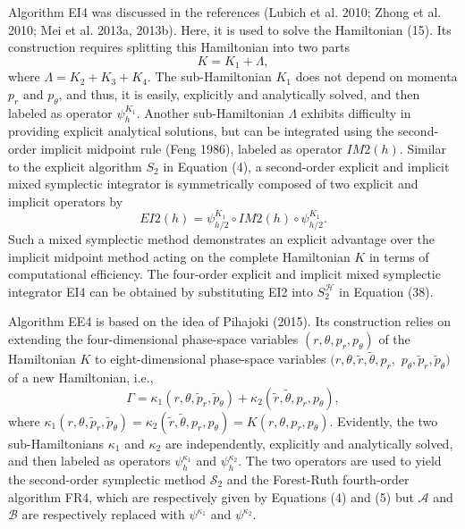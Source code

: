 \documentclass[preprint2]{aastex}
\begin{document}
Algorithm EI4 was discussed in the references (Lubich et al. 2010;
Zhong et al. 2010; Mei et al. 2013a, 2013b). Here, it is used to
solve the Hamiltonian (15). Its construction requires splitting
this Hamiltonian into two parts
\begin{equation}
K=K_1+\Lambda,
\end{equation}
where $\Lambda=K_2+K_3+K_4$. The sub-Hamiltonian $K_1$ does not
depend on momenta $p_r$ and $p_{\theta}$, and thus, it is easily,
explicitly and analytically solved, and then labeled as operator
$\psi^{K_1}_{h}$. Another sub-Hamiltonian $\Lambda$ exhibits
difficulty in providing explicit analytical solutions, but can be
integrated using the second-order implicit midpoint rule (Feng
1986), labeled as operator $IM2(h)$. Similar to the explicit
algorithm $S_2$ in Equation (4), a second-order explicit and
implicit mixed symplectic integrator is symmetrically composed of
two explicit and implicit operators by
\begin{equation}
EI2(h)=\psi^{K_1}_{h/2}\circ IM2(h)\circ\psi^{K_1}_{h/2}.
\end{equation}
Such a mixed symplectic method demonstrates an explicit advantage
over the implicit midpoint method acting on the complete
Hamiltonian $K$ in terms of computational efficiency. The
four-order explicit and implicit mixed symplectic integrator EI4
can be obtained by substituting EI2 into $S^{\mathcal{H}}_2$ in
Equation (38).

Algorithm EE4 is based on the idea of Pihajoki (2015). Its
construction relies on extending the four-dimensional phase-space
variables $(r,\theta, p_r, p_{\theta})$ of the Hamiltonian $K$  to
eight-dimensional phase-space variables
$(r,\theta,\tilde{r},\tilde{\theta}, p_r,$
$p_{\theta},\tilde{p}_r, \tilde{p}_{\theta})$ of a new
Hamiltonian, i.e.,
\begin{equation}
\Gamma=\kappa_1(r,\theta, \tilde{p}_r,
\tilde{p}_{\theta})+\kappa_2(\tilde{r},\tilde{\theta}, p_r,
p_{\theta}),
\end{equation}
where $\kappa_1(r,\theta, \tilde{p}_r,
\tilde{p}_{\theta})=\kappa_2(\tilde{r},\tilde{\theta}, p_r,
p_{\theta})= K(r,\theta, p_r, p_{\theta})$. Evidently, the two
sub-Hamiltonians $\kappa_1$ and $\kappa_2$ are independently,
explicitly and analytically solved, and then labeled as operators
$\psi^{\kappa_1}_{h}$ and $\psi^{\kappa_2}_{h}$. The two operators
are used to yield the second-order symplectic method
$\mathcal{S}_2$ and the Forest-Ruth fourth-order  algorithm FR4,
which are respectively given by Equations (4) and (5) but
$\mathcal{A}$ and $\mathcal{B}$ are respectively replaced with
$\psi^{\kappa_1}$ and $\psi^{\kappa_2}$.
\end{document}
